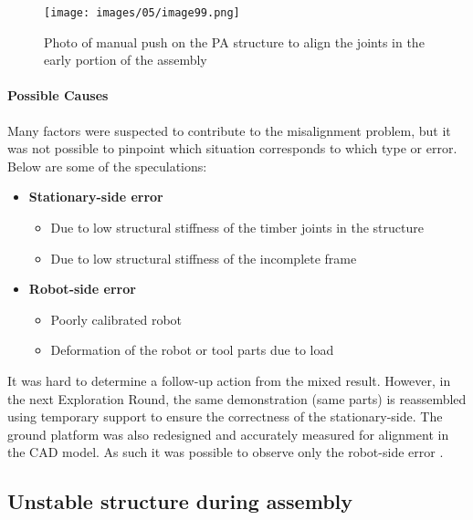 \begin{figure}[!h]
    \centering
    \texttt{[image: images/05/image99.png]}
    \caption{Photo of manual push on the PA structure to align the joints in the early portion of the assembly}
    \label{fig:manual-push-to-align-initial-strucrture}
\end{figure}

\FloatBarrier

\paragraph{Possible Causes}

Many factors were suspected to contribute to the misalignment problem, but it was not possible to pinpoint which situation corresponds to which type or error. Below are some of the speculations:

\begin{itemize}[nosep]
    \item \textbf{Stationary-side error}
    \begin{itemize}
        \item Due to low structural stiffness of the timber joints in the structure
        \item Due to low structural stiffness of the incomplete frame
    \end{itemize}
    \item \textbf{Robot-side error}
    \begin{itemize}
        \item Poorly calibrated robot
        \item Deformation of the robot or tool parts due to load
    \end{itemize}
\end{itemize}

It was hard to determine a follow-up action from the mixed result. However, in the next Exploration Round, the same demonstration (same parts) is reassembled using temporary support  to ensure the correctness of the stationary-side. The ground platform was also redesigned  and accurately measured for alignment in the CAD model. As such it was possible to observe only the robot-side error .

\subsection{Unstable structure during assembly}
\label{subsection:exploration-2-unstable-structure-during-assembly}

